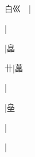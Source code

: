 \begin{multicols}{2}
{{\cjk{}白巛{\cnsym{}　}}|{}\par
\null\par
{\cjk{}{\cnsym{}　}{\cnsym{}　}{\cnsym{}　}}\mktsJzrVerticalBar{}{\cjk{}{\cnsym{}　}{\cnsym{}　}{\cnsym{}　}}|{}\par
\null\par
{\cjk{}{\cnsym{}　}{\cnsym{}　}{\cnsym{}　}}\mktsJzrVerticalBar{}{\cjk{}{\cnsym{}　}{\cnsym{}　}{\cnsym{}　}}|{\cjk{}皛}\par
{\cjk{}{\cnsym{}　}{\cnsym{}　}卄}\mktsJzrVerticalBar{}{\cjk{}{\cnsym{}　}{\cnsym{}　}{\cnsym{}　}}|{\cjk{}藠}\par
{}\mktsJzrVerticalBar{}{\cjk{}{\cnsym{}　}{\cnsym{}　}{\cnsym{}　}}|{}\par
{\cjk{}{\cnsym{}　}{\cnsym{}　}{\cnsym{}　}}|{\cjk{}皨}\par
{\cjk{}{\cnsym{}　}{\cnsym{}　}{\cnsym{}　}}|{}\par
{\cjk{}{\cnsym{}　}{\cnsym{}　}{\cnsym{}　}}|{}\par
}


\end{multicols}

